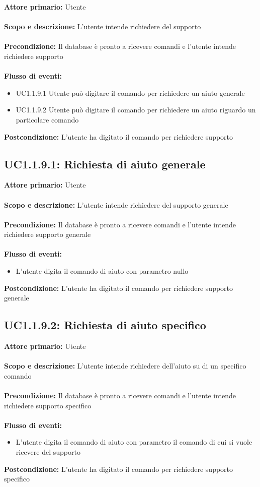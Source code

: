 \documentclass{scalatekids-article}
\begin{document}
\textbf{Attore primario:} Utente \\ \\
\textbf{Scopo e descrizione:} L’utente intende richiedere del supporto\\ \\
\textbf{Precondizione:} Il database è pronto a ricevere comandi e l’utente intende richiedere supporto\\ \\
\textbf{Flusso di eventi:}
\begin{itemize}
\item UC1.1.9.1 Utente può digitare il comando per richiedere un aiuto generale
\item UC1.1.9.2 Utente può digitare il comando per richiedere un aiuto riguardo un particolare comando
\end{itemize}
\textbf{Postcondizione:} L’utente ha digitato il comando per richiedere supporto
\subsection{UC1.1.9.1: Richiesta di aiuto generale}
\textbf{Attore primario:} Utente \\ \\
\textbf{Scopo e descrizione:} L’utente intende richiedere del supporto generale\\ \\
\textbf{Precondizione:} Il database è pronto a ricevere comandi e l’utente intende richiedere supporto generale\\ \\
\textbf{Flusso di eventi:}
\begin{itemize}
\item L’utente digita il comando di aiuto con parametro nullo
\end{itemize}
\textbf{Postcondizione:} L’utente ha digitato il comando per richiedere supporto generale
\subsection{UC1.1.9.2: Richiesta di aiuto specifico}
\textbf{Attore primario:} Utente \\ \\
\textbf{Scopo e descrizione:} L’utente intende richiedere dell’aiuto su di un specifico comando\\ \\
\textbf{Precondizione:} Il database è pronto a ricevere comandi e l’utente intende richiedere supporto specifico\\ \\
\textbf{Flusso di eventi:}
\begin{itemize}
\item L’utente digita il comando di aiuto con parametro il comando di cui si vuole ricevere del supporto
\end{itemize}
\textbf{Postcondizione:} L’utente ha digitato il comando per richiedere supporto specifico
\end{document}
